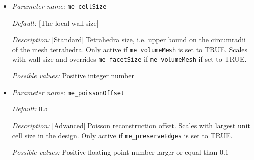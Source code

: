 \begin{itemize}
	
	{\it Default:} 3.0
	
	{\it Description:} [Standard] Tetrahedron shape quality measure, i.e. upper bound for the ratio between the circumradius of a mesh tetrahedron and its shortest edge. Only active if {\tt  me\_volumeMesh} is set to TRUE.
	
	{\it Possible values:} Positive floating point number larger than 2
	
	\item {\it Parameter name:} {\tt me\_cellSize}
	\label{parameters:me_cellSize}
	
	
	{\it Default:} [The local wall size]
	
	{\it Description:} [Standard] Tetrahedra size, i.e. upper bound on the circumradii of the mesh tetrahedra. Only active if {\tt  me\_volumeMesh} is set to TRUE. Scales with wall size and overrides {\tt me\_facetSize} if {\tt me\_volumeMesh} if set to TRUE.
		
	{\it Possible values:} Positive integer number
	
	\item {\it Parameter name:} {\tt me\_poissonOffset}
	\label{parameters:me_poissonOffset}
	
	
	{\it Default:} 0.5
	
	{\it Description:} [Advanced] Poisson reconstruction offset. Scales with largest unit cell size in the design. Only active if {\tt me\_preserveEdges} is set to TRUE.
	
	{\it Possible values:} Positive floating point number larger or equal than 0.1
\end{itemize}

